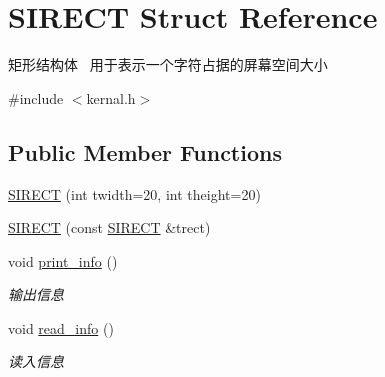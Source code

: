 \hypertarget{struct_s_i_r_e_c_t}{}\section{S\+I\+R\+E\+CT Struct Reference}
\label{struct_s_i_r_e_c_t}


矩形结构体~\newline
用于表示一个字符占据的屏幕空间大小  




{\ttfamily \#include $<$kernal.\+h$>$}

\subsection*{Public Member Functions}
\begin{DoxyCompactItemize}
\item 
\hyperlink{struct_s_i_r_e_c_t_a845bf8054bfcbdf5336798f61d220d05}{S\+I\+R\+E\+CT} (int twidth=20, int theight=20)
\item 
\hyperlink{struct_s_i_r_e_c_t_ac26d21eb684ef839d9ed8312529da7b6}{S\+I\+R\+E\+CT} (const \hyperlink{struct_s_i_r_e_c_t}{S\+I\+R\+E\+CT} \&trect)
\item 
\mbox{\label{struct_s_i_r_e_c_t_a957572a08504c62c09a2aee9c5daef13}} 
void \hyperlink{struct_s_i_r_e_c_t_a957572a08504c62c09a2aee9c5daef13}{print\+\_\+info} ()
\begin{DoxyCompactList}\small\item\em 输出信息 \end{DoxyCompactList}\item 
\mbox{\label{struct_s_i_r_e_c_t_adac76b03ea3b2441cc0ea8af05b7815a}} 
void \hyperlink{struct_s_i_r_e_c_t_adac76b03ea3b2441cc0ea8af05b7815a}{read\+\_\+info} ()
\begin{DoxyCompactList}\small\item\em 读入信息 \end{DoxyCompactList}\end{DoxyCompactItemize}
